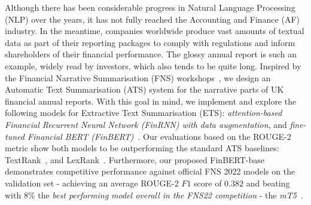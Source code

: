 Although there has been considerable progress in Natural Language Processing (NLP) over the years, it has not fully reached the Accounting and Finance (AF) industry.
In the meantime, companies worldwide produce vast amounts of textual data as part of their reporting packages to comply with regulations and inform shareholders of their financial performance.
The glossy annual report is such an example, widely read by investors, which also tends to be quite long.
Inspired by the Financial Narrative Summarisation (FNS) workshops~\cite{zmandar-etal-2021-financial, fnp-2022-financial},
we design an Automatic Text Summarisation (ATS) system for the narrative parts of UK financial annual reports.
With this goal in mind, we implement and explore the following models for Extractive Text Summarisation (ETS):
\emph{attention-based Financial Recurrent Neural Network (FinRNN) with data augmentation}, and \emph{fine-tuned Financial BERT (FinBERT)}~\cite{yang2020finbert}.
Our evaluations based on the ROUGE-2 metric show both models to be outperforming the standard ATS baselines: TextRank~\cite{mihalcea-tarau-2004-textrank}, and LexRank~\cite{Erkan2004LexRankGC}.
Furthermore, our proposed FinBERT-base demonstrates competitive performance against official FNS 2022 models on the validation set -
achieving an average ROUGE-2 $F1$ score of $0.382$ and beating with 8\% the \emph{best performing model overall in the FNS22 competition} -
the \emph{mT5}~\cite{foroutan-etal-2022-multilingual}.